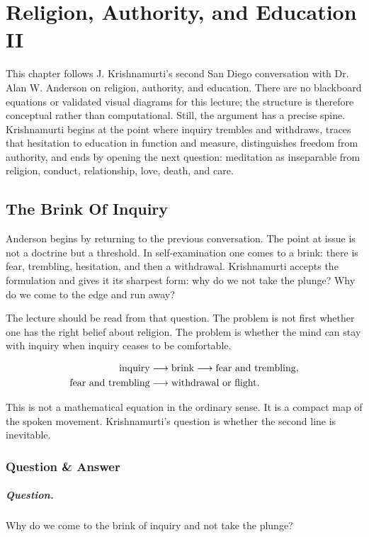 \chapter{Religion, Authority, and Education II}

This chapter follows J. Krishnamurti's second San Diego conversation with Dr. Alan W. Anderson on religion, authority, and education. There are no blackboard equations or validated visual diagrams for this lecture; the structure is therefore conceptual rather than computational. Still, the argument has a precise spine. Krishnamurti begins at the point where inquiry trembles and withdraws, traces that hesitation to education in function and measure, distinguishes freedom from authority, and ends by opening the next question: meditation as inseparable from religion, conduct, relationship, love, death, and care.

\section{The Brink Of Inquiry}

Anderson begins by returning to the previous conversation. The point at issue is not a doctrine but a threshold. In self-examination one comes to a brink: there is fear, trembling, hesitation, and then a withdrawal. Krishnamurti accepts the formulation and gives it its sharpest form: why do we not take the plunge? Why do we come to the edge and run away?

The lecture should be read from that question. The problem is not first whether one has the right belief about religion. The problem is whether the mind can stay with inquiry when inquiry ceases to be comfortable.

\begin{align}
\hbox{inquiry} &\longrightarrow \hbox{brink} \longrightarrow \hbox{fear and trembling},\\
\hbox{fear and trembling} &\longrightarrow \hbox{withdrawal or flight}.
\end{align}

This is not a mathematical equation in the ordinary sense. It is a compact map of the spoken movement. Krishnamurti's question is whether the second line is inevitable.

\subsection{Question \& Answer}

\paragraph{Question.}
Why do we come to the brink of inquiry and not take the plunge?

